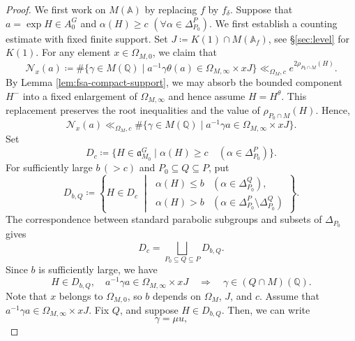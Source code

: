 \documentclass[12pt]{amsart}
\theoremstyle{definition}
\theoremstyle{plain}
\theoremstyle{remark}
\def\Q{\mathbb{Q}}%
\def\A{\mathbb{A}}%
\def\inf{\infty}
\newcommand{\fa}{\mathfrak{a}}
\numberwithin{equation}{section}
\newcommand{\tG}{\widetilde{G}}
\newcommand{\tM}{\widetilde{M}}
\begin{document}
\begin{proof}
We first work on $M(\A)$ by replacing $f$ by $f_\delta$. 
Suppose that $a=\exp H\in A_0^G$ and $\alpha(H)\geq c$ $(\forall \alpha\in \Delta_{P_0}^P)$. 
We first establish a counting estimate with fixed finite support.
Set $J\coloneqq K(1)\cap M(\A_f)$, see \S\ref{sec:level} for $K(1)$.
For any element $x\in \Omega_{M,0}$, we claim that
\begin{equation}\label{eq:cga-lattice-fixed-support}
\mathcal{N}_x(a)\coloneqq \#\{\gamma\in M(\Q)\mid
       a^{-1}\gamma \theta(a)\in \Omega_{M,\inf}\times xJ\}
 \ll_{\Omega_M,c}e^{2\rho_{P_0\cap M}(H)}.
\end{equation}
By Lemma \ref{lem:fsa-compact-support}, we may absorb the bounded component $H^-$ into a fixed enlargement of $\Omega_{M,\infty}$ and hence assume $H=H^\theta$. This replacement preserves the root inequalities and the value of $\rho_{P_0\cap M}(H)$.
Hence, 
\[
\mathcal{N}_x(a)\ll_{\Omega_M,c} \#\{\gamma\in M(\Q)\mid
       a^{-1}\gamma a\in \Omega_{M,\inf}\times xJ\}.
\]
Set
\[
 D_c\coloneqq
 \{H\in\fa_{M_0}^G\mid
     \alpha(H)\geq c\quad(\alpha\in\Delta_{P_0}^P)\}.
\]
For sufficiently large $b\, (>c)$ and $P_0\subseteq Q\subseteq P$, put
\[
 D_{b,Q}\coloneqq
 \left\{H\in D_c\; \middle| \;
 \begin{array}{ll}
 \alpha(H)\leq b
   &(\alpha\in\Delta_{P_0}^Q),\\
 \alpha(H)>b
   &(\alpha\in\Delta_{P_0}^P\setminus\Delta_{P_0}^Q)
 \end{array}\right\}.
\]
The correspondence between standard parabolic subgroups and
subsets of $\Delta_{P_0}$ gives
\[
 D_c=\bigsqcup_{P_0\subseteq Q\subseteq P}D_{b,Q}.
\]
Since $b$ is sufficiently large, we have
\[
 H\in D_{b,Q},\quad
 a^{-1}\gamma a\in \Omega_{M,\infty}\times xJ
 \quad\Longrightarrow\quad
 \gamma\in(Q\cap M)(\Q).
\]
Note that $x$ belongs to $\Omega_{M,0}$, so $b$ depends on $\Omega_M$, $J$, and $c$. 
Assume that $a^{-1}\gamma a\in \Omega_{M,\infty}\times xJ$.
Fix $Q$, and suppose $H\in D_{b,Q}$. 
Then, we can write
\[
 \gamma=\mu u,\qquad
\]
\end{proof}
\end{document}
